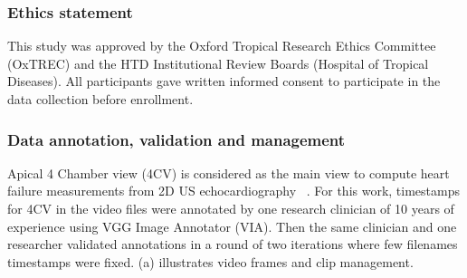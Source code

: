 \documentclass[mlabstract,twocolumn]{jmlr}
\begin{document}
\subsubsection{Ethics statement}
This study was approved by the Oxford Tropical Research Ethics Committee (OxTREC) and the HTD Institutional Review Boards (Hospital of Tropical Diseases).
All participants gave written informed consent to participate in the data collection before enrollment.

\subsubsection{Data annotation, validation and management}
Apical 4 Chamber view (4CV) is considered as the main view to compute heart failure measurements from 2D US echocardiography ~\citep{2017_hall_JIntensiveCareSociety}.
For this work, timestamps for 4CV in the video files were annotated by one research clinician of 10 years of experience using VGG Image Annotator (VIA).
Then the same clinician  and one researcher validated annotations in a round of two iterations where few filenames timestamps were fixed.
(a) illustrates video frames and clip management.
\end{document}
